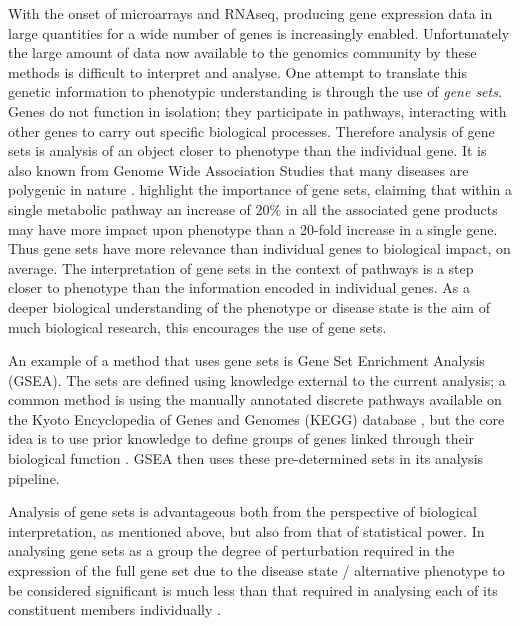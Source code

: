 \documentclass[12pt]{article} %
\begin{document}
	With the onset of microarrays and RNAseq, producing gene expression data in large quantities for a wide number of genes is increasingly enabled. Unfortunately the large amount of data now available to the genomics community by these methods is difficult to interpret and analyse. One attempt to translate this genetic information to phenotypic understanding is through the use of \emph{gene sets}. Genes do not function in isolation; they participate in pathways, interacting with other genes to carry out specific biological processes. Therefore analysis of gene sets is analysis of an object closer to phenotype than the individual gene. It is also known from Genome Wide Association Studies that many diseases are polygenic in nature \citep{MooneyGenesetanalysis2015}. \citet{SubramanianGenesetenrichment2005a} highlight the importance of gene sets, claiming that within a single metabolic pathway an increase of $20\%$ in all the associated gene products may have more impact upon phenotype than a 20-fold increase in a single gene.  Thus gene sets have more relevance than individual genes to biological impact, on average. The interpretation of gene sets in the context of pathways is a step closer to phenotype than the information encoded in individual genes. As a deeper biological understanding of the phenotype or disease state is the aim of much biological research, this encourages the use of gene sets.
	
	An example of a method that uses gene sets is Gene Set Enrichment Analysis (GSEA). The sets are defined using knowledge external to the current analysis; a common method is using the manually annotated discrete pathways available on the Kyoto Encyclopedia of Genes and Genomes (KEGG) database \citep{FridleyGenesetanalysis2011}, but the core idea is to use prior knowledge to define groups of genes linked through their biological function \citep{HejblumTimeCourseGeneSet2015}. GSEA then uses these pre-determined sets in its analysis pipeline.
	
	Analysis of gene sets is advantageous both from the perspective of biological interpretation, as mentioned above, but also from that of statistical power. In analysing gene sets as a group the degree of perturbation required in the expression of the full gene set due to the disease state / alternative phenotype to be considered significant is much less than that required in analysing each of its constituent members individually \citep{DudbridgePowerPredictiveAccuracy2013, WrayResearchReviewPolygenic2014, MooneyGenesetanalysis2015}.
	
\end{document}
